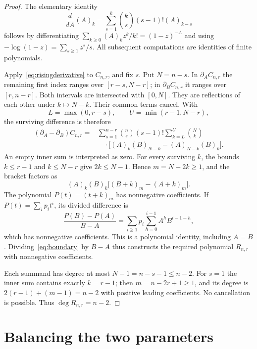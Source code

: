 \documentclass[10pt]{article}
\begin{document}
\begin{proof}
The elementary identity
\begin{equation}
 \frac{d}{dA}(A)_k
 =\sum_{s=1}^k\binom ks(s-1)!(A)_{k-s}
 \label{eq:risingderivative}
\end{equation}
follows by differentiating
$\sum_{k\geq0}(A)_kz^k/k!=(1-z)^{-A}$ and using
$-\log(1-z)=\sum_{s\geq1}z^s/s$.
All subsequent computations are identities of finite polynomials.

Apply~\eqref{eq:risingderivative} to $C_{n,r}$, and fix $s$.
Put $N=n-s$. In $\partial_A C_{n,r}$ the remaining first index ranges
over $[r-s,N-r]$; in $\partial_B C_{n,r}$ it ranges over
$[r,n-r]$. Both intervals are intersected with $[0,N]$.
They are reflections of each other under $k\mapsto N-k$.
Their common terms cancel. With
\[
 L=\max(0,r-s),\qquad U=\min(r-1,N-r),
\]
the surviving difference is therefore
\begin{equation}
 \begin{split}
 (\partial_A-\partial_B)C_{n,r}
 ={}&\sum_{s=1}^{n-r}\binom ns(s-1)!
 \sum_{k=L}^{U}\binom Nk\\
 &\quad\cdot\bigl[(A)_k(B)_{N-k}
                    -(A)_{N-k}(B)_k\bigr].
 \end{split}
 \label{eq:boundary}
\end{equation}
An empty inner sum is interpreted as zero.
For every surviving $k$, the bounds $k\leq r-1$ and $k\leq N-r$
give $2k\leq N-1$.
Hence $m=N-2k\geq1$, and the bracket factors as
\[
 (A)_k(B)_k\bigl[(B+k)_m-(A+k)_m\bigr].
\]
The polynomial $P(t)=(t+k)_m$ has nonnegative coefficients.
If $P(t)=\sum_i p_i t^i$, its divided difference is
\begin{equation}
 \frac{P(B)-P(A)}{B-A}
 =\sum_{i\geq1}p_i\sum_{h=0}^{i-1}A^hB^{i-1-h},
 \label{eq:quotient}
\end{equation}
which has nonnegative coefficients. This is a polynomial identity,
including $A=B$.
Dividing~\eqref{eq:boundary} by $B-A$ thus constructs the required
polynomial $R_{n,r}$ with nonnegative coefficients.

Each summand has degree at most $N-1=n-s-1\leq n-2$.
For $s=1$ the inner sum contains exactly $k=r-1$; then
$m=n-2r+1\geq1$, and its degree is
$2(r-1)+(m-1)=n-2$ with positive leading coefficients.
No cancellation is possible. Thus $\deg R_{n,r}=n-2$.
\end{proof}

\section*{Balancing the two parameters}
\end{document}
